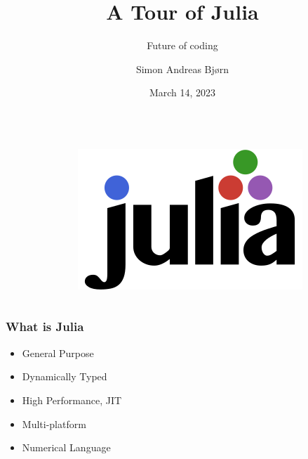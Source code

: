 \documentclass[compress,aspectratio=169]{beamer}
\title{A Tour of Julia}
\subtitle{Future of coding}
\author{\large Simon Andreas Bjørn}
\date{\large March 14, 2023}
\begin{document}
\begin{frame} %
    \maketitle
    \begin{columns}
        \begin{column}{0.7\textwidth}
        \end{column}
        \begin{column}{0.3\textwidth}
            \begin{figure}
                \includegraphics[width=\columnwidth]{"julia-logo-color.png"}
            \end{figure}
        \end{column}
    \end{columns}
\end{frame}

\begin{frame} %
    \frametitle{What is Julia}
    \begin{itemize}
        \item General Purpose
        \item Dynamically Typed
        \item High Performance, JIT
        \item Multi-platform
        \item Numerical Language
    \end{itemize}
\end{frame} %
\end{document}
